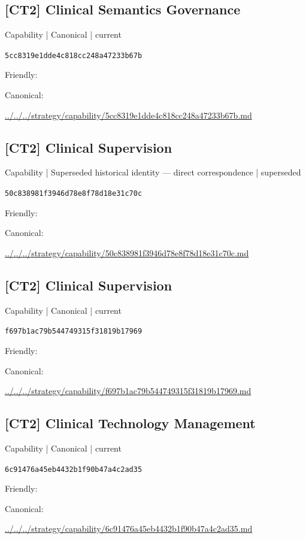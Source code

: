 \documentclass[10pt,a4paper]{article}
\begin{document}
\subsection*{[CT2] Clinical Semantics Governance}
{\small Capability | Canonical | current}\par
\texttt{5cc8319e1dde4c818cc248a47233b67b}\par
Friendly: \par
Canonical: \par
{\footnotesize\url{../../../strategy/capability/5cc8319e1dde4c818cc248a47233b67b.md}}\par
\subsection*{[CT2] Clinical Supervision}
{\small Capability | Superseded historical identity — direct correspondence | superseded}\par
\texttt{50c838981f3946d78e8f78d18e31c70c}\par
Friendly: \par
Canonical: \par
{\footnotesize\url{../../../strategy/capability/50c838981f3946d78e8f78d18e31c70c.md}}\par
\subsection*{[CT2] Clinical Supervision}
{\small Capability | Canonical | current}\par
\texttt{f697b1ac79b544749315f31819b17969}\par
Friendly: \par
Canonical: \par
{\footnotesize\url{../../../strategy/capability/f697b1ac79b544749315f31819b17969.md}}\par
\subsection*{[CT2] Clinical Technology Management}
{\small Capability | Canonical | current}\par
\texttt{6c91476a45eb4432b1f90b47a4c2ad35}\par
Friendly: \par
Canonical: \par
{\footnotesize\url{../../../strategy/capability/6c91476a45eb4432b1f90b47a4c2ad35.md}}\par
\end{document}
